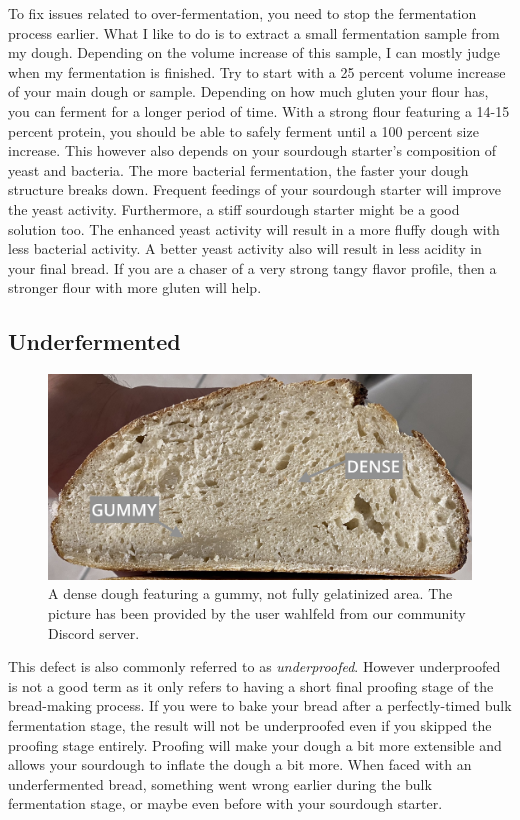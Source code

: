 To fix issues related to over-fermentation, you need to stop the fermentation process
earlier. What I like to do is to extract a small fermentation sample from my dough.
Depending on the volume increase of this sample, I can mostly judge when my fermentation
is finished. Try to start with a 25 percent volume increase of your main dough or sample.
Depending on how much gluten your flour has, you can ferment for a longer period of time.
With a strong flour featuring a 14-15 percent protein, you should be able to safely
ferment until a 100 percent size increase. This however also depends on your
sourdough starter's composition of yeast and bacteria. The more bacterial fermentation,
the faster your dough structure breaks down. Frequent feedings of your sourdough
starter will improve the yeast activity. Furthermore, a stiff sourdough starter
might be a good solution too. The enhanced yeast activity will result in a more fluffy
dough with less bacterial activity. A better yeast activity also will result
in less acidity in your final bread. If you are a chaser of a very strong tangy
flavor profile, then a stronger flour with more gluten will help.


\subsection{Underfermented}

\begin{figure}
  \includegraphics[width=\textwidth]{fermented-too-short-underbaked}
  \caption{A dense dough featuring a gummy, not fully gelatinized area.
  The picture has been provided by the user wahlfeld from our community Discord server.}
  \label{fig:fermented-too-short-underbaked}
\end{figure}

This defect is also commonly referred to as {\it underproofed}. However underproofed
is not a good term as it only refers to having a short final
proofing stage of the bread-making process.
If you were to bake your bread after a perfectly-timed bulk fermentation stage,
the result will not be underproofed even if you skipped the proofing stage entirely.
Proofing will make your dough a bit more extensible and allows your sourdough
to inflate the dough a bit more. When faced with an underfermented bread, something
went wrong earlier during the bulk fermentation stage, or maybe even
before with your sourdough starter.

